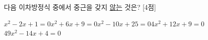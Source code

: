 다음 이차방정식 중에서 중근을 갖지 \underline{않는} 것은? \mbox{[4점]}
\begin{choicesii}{$x^2-2x+1=0$}{$x^2+6x+9=0$}{$x^2-10x+25=0$}{$4x^2+12x+9=0$}{$49x^2-14x+4=0$}\end{choicesii}
